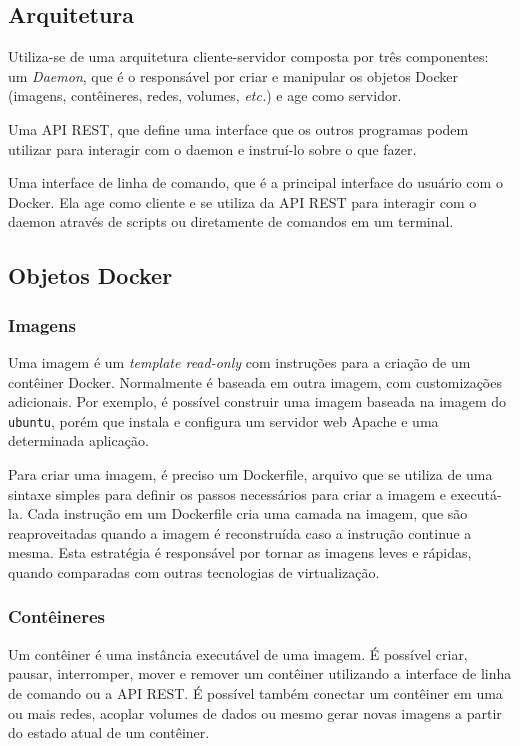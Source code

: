     	\subsection{Arquitetura}
    	    Utiliza-se de uma arquitetura cliente-servidor composta por três componentes: um \textit{Daemon}, que é o responsável por criar e manipular os objetos Docker (imagens, contêineres, redes, volumes, \textit{etc.}) e age como servidor.
    	
    	    Uma API REST, que define uma interface que os outros programas podem utilizar para interagir com o daemon e instruí-lo sobre o que fazer.
    	
    	    Uma interface de linha de comando, que é a principal interface do usuário com o Docker. Ela age como cliente e se utiliza da API REST para interagir com o daemon através de scripts ou diretamente de comandos em um terminal.
    	
    	\subsection{Objetos Docker}
    	    \subsubsection{Imagens}
    	        Uma imagem é um \textit{template read-only} com instruções para a criação de um contêiner Docker. Normalmente é baseada em outra imagem, com customizações adicionais. Por exemplo, é possível construir uma imagem baseada na imagem do \texttt{ubuntu}, porém que instala e configura um servidor web Apache e uma determinada aplicação.
    	
    	        Para criar uma imagem, é preciso um Dockerfile, arquivo que se utiliza de uma sintaxe simples para definir os passos necessários para criar a imagem e executá-la. Cada instrução em um Dockerfile cria uma camada na imagem, que são reaproveitadas quando a imagem é reconstruída caso a instrução continue a mesma. Esta estratégia é responsável por tornar as imagens leves e rápidas, quando comparadas com outras tecnologias de virtualização.
    	
        	\subsubsection{Contêineres}
        	    Um contêiner é uma instância executável de uma imagem. É possível criar, pausar, interromper, mover e remover um contêiner utilizando a interface de linha de comando ou a API REST. É possível também conectar um contêiner em uma ou mais redes, acoplar volumes de dados ou mesmo gerar novas imagens a partir do estado atual de um contêiner.
        	
